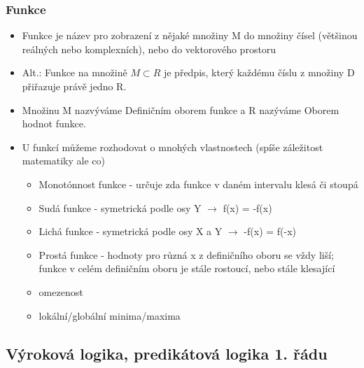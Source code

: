 \documentclass[10pt,a4paper]{article}
\begin{document}
\subsubsection{Funkce}
\begin{itemize}
\item Funkce je název pro zobrazení z nějaké množiny M do množiny čísel (většinou reálných nebo komplexních), nebo do vektorového prostoru
\item Alt.: Funkce na množině $M \subset  R$ je předpis, který každému číslu z množiny D přiřazuje právě jedno R.
\item Množinu M nazvýváme Definičním oborem funkce a R nazýváme Oborem hodnot funkce.
\item U funkcí můžeme rozhodovat o mnohých vlastnostech (spíše záležitost matematiky ale co)
\begin{itemize}
\item Monotónnost funkce - určuje zda funkce v daném intervalu klesá či stoupá
\item Sudá funkce - symetrická podle osy Y $\rightarrow$ f(x) = -f(x)
\item Lichá funkce - symetrická podle osy X a Y $\rightarrow$ -f(x) = f(-x)
\item Prostá funkce - hodnoty pro různá x z definičního oboru se vždy liší; funkce v celém definičním oboru je stále rostoucí, nebo stále klesající
\item omezenost
\item lokální/globální minima/maxima
\end{itemize}
\end{itemize}

\subsection{Výroková logika, predikátová logika 1. řádu}
\end{document}
